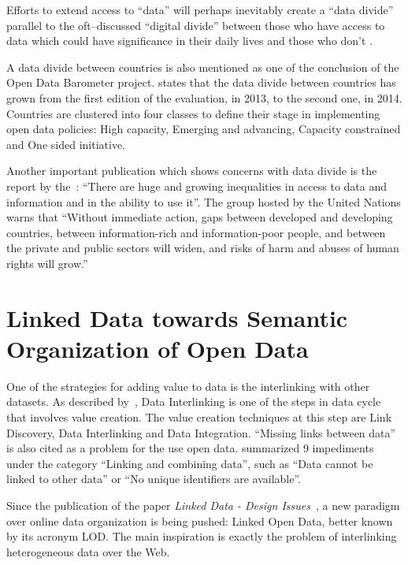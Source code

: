 \begin{citacao}
Efforts to extend access to “data” will perhaps inevitably create a “data divide” parallel to the oft–discussed “digital divide” between those who have access to data which could have significance in their daily lives and those who don’t \cite{Gurstein2011}.
\end{citacao}

A data divide between countries is also mentioned as one of the conclusion of the Open Data Barometer project.
 states that the data divide between countries has grown from the first edition of the evaluation, in 2013, to the second one, in 2014.
Countries are clustered into four classes to define their stage in implementing open data policies: High capacity, Emerging and advancing, Capacity constrained and One sided initiative.

Another important publication which shows concerns with data divide is the report by the~: ``There are huge and growing inequalities in access to data and information and in the ability to use it''.
The group hosted by the United Nations warns that ``Without immediate action, gaps between developed and developing countries, between information-rich and information-poor people, and between the private and public sectors will widen, and risks of harm and abuses of human rights will grow.''


\section{Linked Data towards Semantic Organization of Open Data}

\label{sec:LOD}

One of the strategies for adding value to data is the interlinking with other datasets.
As described by~, Data Interlinking is one of the steps in data cycle that involves value creation.
The value creation techniques at this step are Link Discovery, Data Interlinking and Data Integration.
``Missing links between data'' is also cited as a problem for the use open data.
 summarized 9 impediments under the category ``Linking and combining data'', such as ``Data cannot be linked to other data'' or ``No unique identifiers are available''.

Since the publication of the paper \emph{Linked Data - Design Issues}~\cite{Berners-Lee2006}, a new paradigm over online data organization is being pushed: Linked Open Data, better known by its acronym LOD.
The main inspiration is exactly the problem of interlinking heterogeneous data over the Web.

